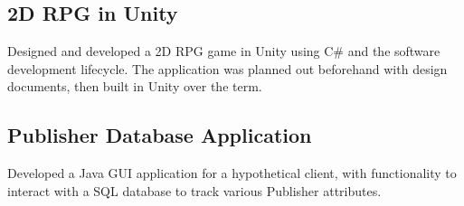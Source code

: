 \documentclass[a4paper, 12pt]{article}
\begin{document}
\subsection {{}\hfill }


\subsection {{2D RPG in Unity}\hfill }
Designed and developed a 2D RPG game in Unity using C\# and the software development lifecycle. The application was planned out beforehand with design documents, then built in Unity over the term.
\subsection {{}\hfill }

\subsection {{Publisher Database Application}\hfill }
 Developed a Java GUI application for a hypothetical client, with functionality to interact with a SQL database to track various Publisher attributes.
\end{document}
